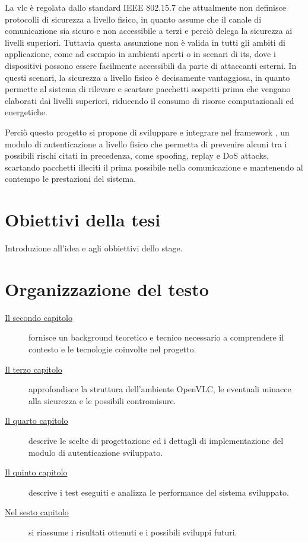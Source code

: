 La \gls{vlc} è regolata dallo standard IEEE 802.15.7 che attualmente non definisce protocolli di sicurezza a livello fisico, in quanto assume che il canale di comunicazione sia sicuro e non accessibile a terzi e perciò delega la sicurezza ai livelli superiori. Tuttavia questa assunzione non è valida in tutti gli ambiti di applicazione, come ad esempio in ambienti aperti o in scenari di \gls{its}, dove i dispositivi possono essere facilmente accessibili da parte di attaccanti esterni.
In questi scenari, la sicurezza a livello fisico è decisamente vantaggiosa, in quanto permette al sistema di rilevare e scartare pacchetti sospetti prima che vengano elaborati dai livelli superiori, riducendo il consumo di risorse computazionali ed energetiche.

Perciò questo progetto si propone di sviluppare e integrare nel framework \cite{site:openvlc}, un modulo di autenticazione a livello fisico che permetta di prevenire alcuni tra i possibili rischi citati in precedenza, come spoofing, replay e DoS attacks, scartando pacchetti illeciti il prima possibile nella comunicazione e mantenendo al contempo le prestazioni del sistema.

\section{Obiettivi della tesi}

Introduzione all'idea e agli obbiettivi dello stage.

\section{Organizzazione del testo}

\begin{description}
    \item[{\hyperref[cap:background]{Il secondo capitolo}}] fornisce un background teoretico e tecnico necessario a comprendere il contesto e le tecnologie coinvolte nel progetto. 
    
    \item[{\hyperref[cap:analisi]{Il terzo capitolo}}] approfondisce la struttura dell'ambiente OpenVLC, le eventuali minacce alla sicurezza e le possibili contromisure.
    
    \item[{\hyperref[cap:progettazione]{Il quarto capitolo}}] descrive le scelte di progettazione ed i dettagli di implementazione del modulo di autenticazione sviluppato.
    
    \item[{\hyperref[cap:test]{Il quinto capitolo}}] descrive i test eseguiti e analizza le performance del sistema sviluppato.
        
    \item[{\hyperref[cap:conclusioni]{Nel sesto capitolo}}] si riassume i risultati ottenuti e i possibili sviluppi futuri.
\end{description}

